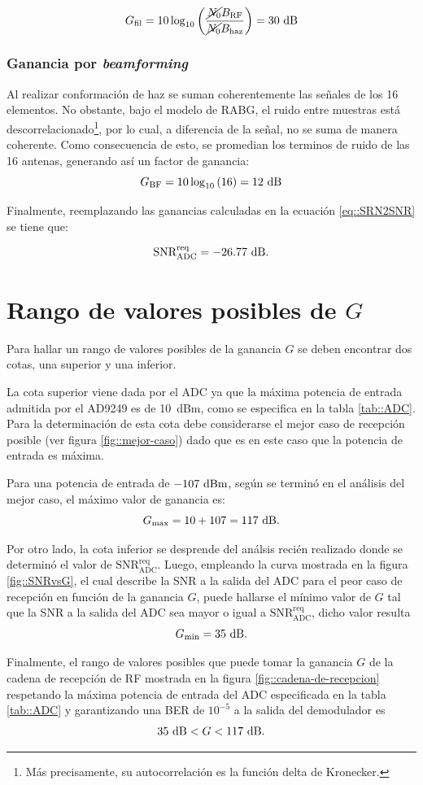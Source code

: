 \documentclass[../../main.tex]{subfiles}
\begin{document}
\[G_\textrm{fil} = 10 \log_{10}\left(\frac{\cancel{N_0} B_\textrm{RF}}{\cancel{N_0} B_\textrm{haz}}\right) = 30~\textrm{dB}\]

\subsubsection{Ganancia por \textit{beamforming}}
Al realizar conformación de haz se suman coherentemente las señales de los 16 elementos. No obstante, bajo el modelo de RABG, el ruido entre muestras está descorrelacionado\footnote{Más precisamente, su autocorrelación es la función delta de Kronecker.}, por lo cual, a diferencia de la señal, no se suma de manera coherente.
Como consecuencia de esto, se promedian los terminos de ruido de las 16 antenas, generando así un factor de ganancia:
\[G_\textrm{BF} = 10 \log_{10}{(16)} = 12~\textrm{dB}\]

Finalmente, reemplazando las ganancias calculadas en la ecuación \ref{eq::SRN2SNR} se tiene que:

\begin{equation}
    \textrm{SNR}^\textrm{req}_\textrm{ADC} = -26.77~\textrm{dB}.
    \label{eq::SNRreqADC}
\end{equation}
 
\section{Rango de valores posibles de $G$}
Para hallar un rango de valores posibles de la ganancia $G$ se deben encontrar dos cotas, una superior y una inferior.

La cota superior viene dada por el ADC ya que la máxima potencia de entrada admitida por el AD9249 es de 10~dBm, como se especifica en la tabla \ref{tab::ADC}. Para la determinación de esta cota debe considerarse el mejor caso de recepción posible (ver figura \ref{fig::mejor-caso}) dado que es en este caso que la potencia de entrada es máxima.

Para una potencia de entrada de $-107~\textrm{dBm}$, según se terminó en el análisis del mejor caso, el máximo valor de ganancia es:
\[G_\textrm{max} = 10 + 107 = 117~\textrm{dB}.\]

Por otro lado, la cota inferior se desprende del análsis recién realizado donde se determinó el valor de $\textrm{SNR}^\textrm{req}_\textrm{ADC}$. Luego, empleando la curva mostrada en la figura \ref{fig::SNRvsG}, el cual describe la SNR a la salida del ADC para el peor caso de recepción en función de la ganancia $G$, puede hallarse el mínimo valor de $G$ tal que la SNR a la salida del ADC sea mayor o igual a $\textrm{SNR}^\textrm{req}_\textrm{ADC}$, dicho valor resulta \[G_\textrm{min} = 35~\textrm{dB}.\] 

Finalmente, el rango de valores posibles que puede tomar la ganancia $G$ de la cadena de recepción de RF mostrada en la figura \ref{fig::cadena-de-recepcion} respetando la máxima potencia de entrada del ADC especificada en la tabla \ref{tab::ADC} y garantizando una BER de $10^{-5}$ a la salida del demodulador es \[35~\textrm{dB} < G < 117~\textrm{dB}.\]
\end{document}
